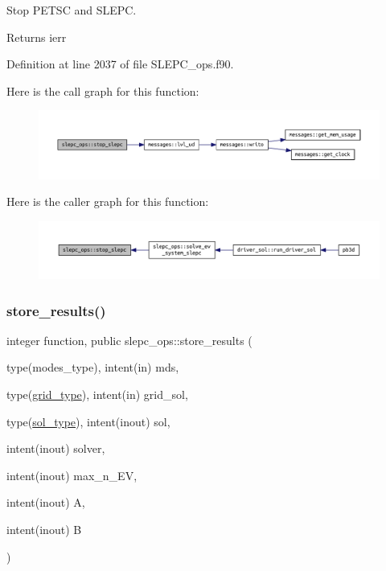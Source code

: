 Stop P\+E\+T\+SC and S\+L\+E\+PC. 

\begin{DoxyReturn}{Returns}
ierr 
\end{DoxyReturn}


Definition at line 2037 of file S\+L\+E\+P\+C\+\_\+ops.\+f90.

Here is the call graph for this function\+:\nopagebreak
\begin{figure}[H]
\begin{center}
\leavevmode
\includegraphics[width=350pt]{namespaceslepc__ops_aeeac6908b3988f395314e7769829a058_cgraph}
\end{center}
\end{figure}
Here is the caller graph for this function\+:\nopagebreak
\begin{figure}[H]
\begin{center}
\leavevmode
\includegraphics[width=350pt]{namespaceslepc__ops_aeeac6908b3988f395314e7769829a058_icgraph}
\end{center}
\end{figure}
\mbox{\label{namespaceslepc__ops_a24d97496000ed55f1d11e4d436e084a6}} 
\subsubsection{\texorpdfstring{store\+\_\+results()}{store\_results()}}
{\footnotesize\ttfamily integer function, public slepc\+\_\+ops\+::store\+\_\+results (\begin{DoxyParamCaption}\item[{type(modes\+\_\+type), intent(in)}]{mds,  }\item[{type(\hyperlink{structgrid__vars_1_1grid__type}{grid\+\_\+type}), intent(in)}]{grid\+\_\+sol,  }\item[{type(\hyperlink{structsol__vars_1_1sol__type}{sol\+\_\+type}), intent(inout)}]{sol,  }\item[{intent(inout)}]{solver,  }\item[{intent(inout)}]{max\+\_\+n\+\_\+\+EV,  }\item[{intent(inout)}]{A,  }\item[{intent(inout)}]{B }\end{DoxyParamCaption})}



